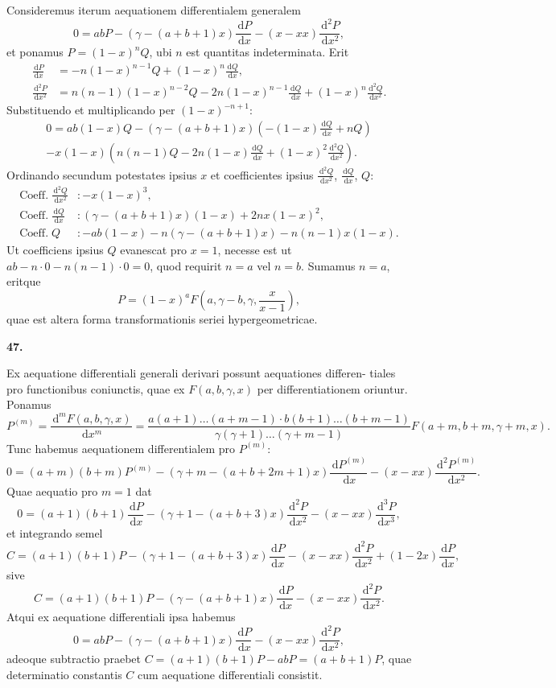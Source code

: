 \documentclass[12pt,a4paper]{article}
\newcommand{\dd}{\,\mathrm{d}}
\begin{document}
Consideremus iterum aequationem differentialem generalem
\[
0 = abP - (\gamma - (a+b+1)x) \frac{\dd P}{\dd x} - (x-xx) \frac{\dd^2 P}{\dd x^2},
\]
et ponamus $P = (1-x)^n Q$, ubi $n$ est quantitas indeterminata. Erit
\begin{align*}
\frac{\dd P}{\dd x} &= -n(1-x)^{n-1} Q + (1-x)^n \frac{\dd Q}{\dd x}, \\
\frac{\dd^2 P}{\dd x^2} &= n(n-1)(1-x)^{n-2} Q - 2n(1-x)^{n-1} \frac{\dd Q}{\dd x} + (1-x)^n \frac{\dd^2 Q}{\dd x^2}.
\end{align*}
Substituendo et multiplicando per $(1-x)^{-n+1}$:
\begin{multline*}
0 = ab(1-x) Q - (\gamma - (a+b+1)x)(-(1-x) \frac{\dd Q}{\dd x} + nQ) \\
- x(1-x)(n(n-1)Q - 2n(1-x) \frac{\dd Q}{\dd x} + (1-x)^2 \frac{\dd^2 Q}{\dd x^2}).
\end{multline*}
Ordinando secundum potestates ipsius $x$ et coefficientes ipsius $\frac{\dd^2 Q}{\dd x^2}$, $\frac{\dd Q}{\dd x}$, $Q$:
\begin{align*}
\text{Coeff.} \; \frac{\dd^2 Q}{\dd x^2} &: -x(1-x)^3, \\
\text{Coeff.} \; \frac{\dd Q}{\dd x} &: (\gamma - (a+b+1)x)(1-x) + 2nx(1-x)^2, \\
\text{Coeff.} \; Q &: -ab(1-x) - n(\gamma - (a+b+1)x) - n(n-1)x(1-x).
\end{align*}
Ut coefficiens ipsius $Q$ evanescat pro $x = 1$, necesse est ut $ab - n \cdot 0 - n(n-1) \cdot 0 = 0$,
quod requirit $n = a$ vel $n = b$. Sumamus $n = a$, eritque
\[
P = (1-x)^a F(a, \gamma-b, \gamma, \frac{x}{x-1}),
\]
quae est altera forma transformationis seriei hypergeometricae.

\textbf{47.}

Ex aequatione differentiali generali derivari possunt aequationes differen-
tiales pro functionibus coniunctis, quae ex $F(a,b,\gamma,x)$ per differentiationem
oriuntur. Ponamus
\[
P^{(m)} = \frac{\dd^m F(a,b,\gamma,x)}{\dd x^m} = \frac{a(a+1)\ldots(a+m-1) \cdot b(b+1)\ldots(b+m-1)}{\gamma(\gamma+1)\ldots(\gamma+m-1)} F(a+m, b+m, \gamma+m, x).
\]
Tunc habemus aequationem differentialem pro $P^{(m)}$:
\[
0 = (a+m)(b+m) P^{(m)} - (\gamma+m - (a+b+2m+1)x) \frac{\dd P^{(m)}}{\dd x} - (x-xx) \frac{\dd^2 P^{(m)}}{\dd x^2}.
\]
Quae aequatio pro $m = 1$ dat
\[
0 = (a+1)(b+1) \frac{\dd P}{\dd x} - (\gamma+1 - (a+b+3)x) \frac{\dd^2 P}{\dd x^2} - (x-xx) \frac{\dd^3 P}{\dd x^3},
\]
et integrando semel
\[
C = (a+1)(b+1) P - (\gamma+1 - (a+b+3)x) \frac{\dd P}{\dd x} - (x-xx) \frac{\dd^2 P}{\dd x^2} + (1-2x) \frac{\dd P}{\dd x},
\]
sive
\[
C = (a+1)(b+1) P - (\gamma - (a+b+1)x) \frac{\dd P}{\dd x} - (x-xx) \frac{\dd^2 P}{\dd x^2}.
\]
Atqui ex aequatione differentiali ipsa habemus
\[
0 = abP - (\gamma - (a+b+1)x) \frac{\dd P}{\dd x} - (x-xx) \frac{\dd^2 P}{\dd x^2},
\]
adeoque subtractio praebet $C = (a+1)(b+1)P - abP = (a+b+1)P$, quae
determinatio constantis $C$ cum aequatione differentiali consistit.
\end{document}
